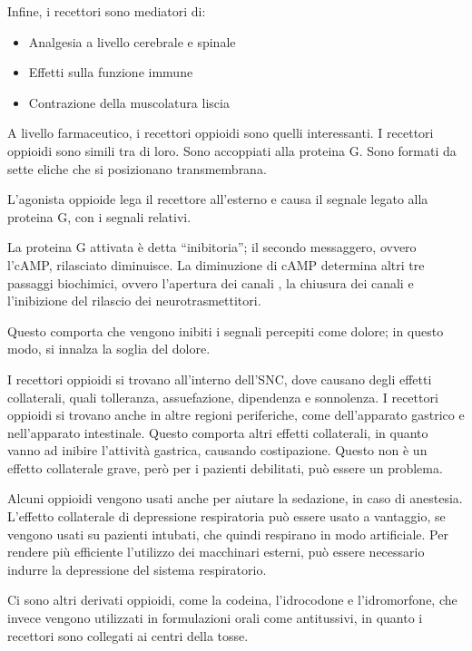 Infine, i recettori \delta{} sono mediatori di:

\begin{itemize}
\item
  Analgesia a livello cerebrale e spinale
\item
  Effetti sulla funzione immune
\item
  Contrazione della muscolatura liscia
\end{itemize}

A livello farmaceutico, i recettori oppioidi \mu{} sono quelli
interessanti.
I recettori oppioidi sono simili tra di loro. Sono accoppiati alla
proteina G. Sono formati da sette eliche che si posizionano
transmembrana.


L'agonista oppioide lega il recettore all'esterno e causa il segnale
legato alla proteina G, con i segnali relativi.

La proteina G attivata è detta ``inibitoria''; il secondo messaggero,
ovvero l'cAMP, rilasciato diminuisce. La diminuzione di cAMP determina
altri tre passaggi biochimici, ovvero l'apertura dei canali , la
chiusura dei canali  e l'inibizione del rilascio dei
neurotrasmettitori.

Questo comporta che vengono inibiti i segnali percepiti come dolore; in
questo modo, si innalza la soglia del dolore.

I recettori oppioidi si trovano all'interno dell'SNC, dove causano degli
effetti collaterali, quali tolleranza, assuefazione, dipendenza e
sonnolenza. I recettori oppioidi si trovano anche in altre regioni
periferiche, come dell'apparato gastrico e nell'apparato intestinale.
Questo comporta altri effetti collaterali, in quanto vanno ad inibire
l'attività gastrica, causando costipazione. Questo non è un effetto
collaterale grave, però per i pazienti debilitati, può essere un
problema.


Alcuni oppioidi vengono usati anche per aiutare la sedazione, in caso di
anestesia. L'effetto collaterale di depressione respiratoria può essere
usato a vantaggio, se vengono usati su pazienti intubati, che quindi
respirano in modo artificiale. Per rendere più efficiente l'utilizzo dei
macchinari esterni, può essere necessario indurre la depressione del
sistema respiratorio.

Ci sono altri derivati oppioidi, come la codeina, l'idrocodone e
l'idromorfone, che invece vengono utilizzati in formulazioni orali come
antitussivi, in quanto i recettori \mu{} sono collegati ai centri della
tosse.

